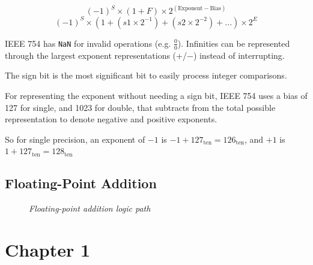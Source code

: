 \documentclass[11pt]{article}
\begin{document}
\vspace{-2em}
$$(-1)^S \times (1 + F) \times 2^{(\text{Exponent} - \text{Bias})}$$
\vspace{-2em}
$$(-1)^S \times (1 + (s1 \times 2^{-1}) + (s2 \times 2^{-2}) + ...) \times 2^E$$

IEEE 754 has \texttt{NaN} for invalid operations (e.g. $\frac{0}{0}$). Infinities can be represented through the largest exponent representations (+/$-$) instead of interrupting.

The sign bit is the most significant bit to easily process integer comparisons.

For representing the exponent without needing a sign bit, IEEE 754 uses a bias of 127 for single, and 1023 for double, that subtracts from the total possible representation to denote negative and positive exponents.

So for single precision, an exponent of $-1$ is $-1 + 127_{\text{ten}} = 126_{\text{ten}}$, and $+1$ is $1 + 127_{\text{ten}} = 128_{\text{ten}}$

\subsection*{Floating-Point Addition}

\begin{figure}[htbp]
    \centering
    \caption{\textit{Floating-point addition logic path}}
\end{figure}
\pagebreak
\section*{Chapter 1}
\end{document}
